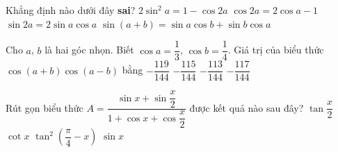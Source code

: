 

\begin{ex}%
	Khẳng định nào  dưới đây \textbf{sai}?
	\choice 
		{$2\sin  ^2a=1-\cos 2a$}
		{\True $\cos 2a=2\cos  a-1$}
		{$\sin 2a=2\sin a\cos a$} 
		{$\sin \left(a+b\right)=\sin a\cos b+\sin  b\cos a$}
\end{ex}

\begin{ex}%
	Cho $a$, $b$ là hai góc nhọn. Biết $\cos  a=\dfrac {1}{3}$, $\cos b=\dfrac {1}{4}$. Giá trị của biểu thức \\$\cos (a+b) \cos (a-b)$ bằng
	\choice 
		{\True $-\dfrac {119}{144}$} 
		 {$-\dfrac {115}{144}$}
		{$-\dfrac {113}{144}$} 
		{$-\dfrac {117}{144}$} 
\end{ex}

\begin{ex}%
	Rút gọn biểu thức $A=\dfrac{\sin x+\sin \dfrac{x}{2}}{1+\cos x+\cos \dfrac{x}{2}}$ được kết quả nào sau  đây?
	 \choice
		{\True $\tan \dfrac{x}{2}$} 
		{$\cot  x$}
		 {$\tan ^2\left(\dfrac{\pi}{4}-x\right)$}
		{$\sin x$} 
\end{ex}

